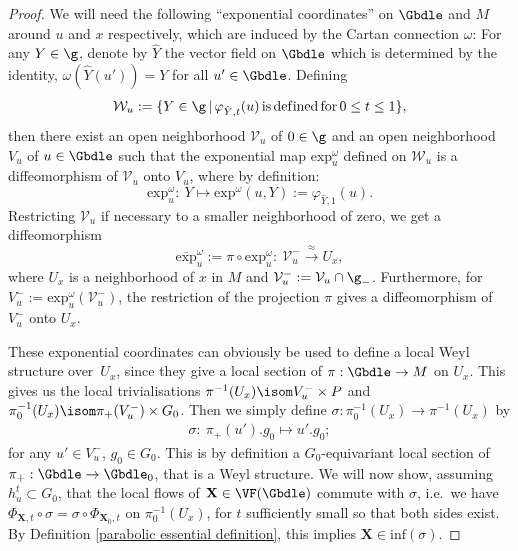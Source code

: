 \begin{proof} We will need the following ``exponential coordinates'' on $\Gbdle$ and $M$ around $u$ and $x$ respectively, which are induced by the Cartan connection $\omega$: For any $Y \in \g$, denote by $\hat{Y}$ the vector f\/ield on $\Gbdle$ which is determined by the identity, $\omega(\hat{Y}(u')) = Y$ for all $u' \in \Gbdle$. Def\/ining
\[
\mathcal{W}_u := \{ Y \in \g \, \vert \, \varphi_{\hat{Y},t}(u) \, \mathrm{is} \, \mathrm{def\/ined} \, \mathrm{for} \, 0 \leq t \leq 1 \},
\]
then there exist an open neighborhood $\mathcal{V}_u$ of $0 \in \g$ and an open neighborhood $V_u$ of $u \in \Gbdle$ such that the exponential map $\mathrm{exp}_u^{\omega}$ def\/ined on $\mathcal{W}_u$ is a dif\/feomorphism of $\mathcal{V}_u$ onto $V_u$, where by def\/inition:
\[
\mathrm{exp}_u^{\omega}: \  Y \mapsto \mathrm{exp}^{\omega}(u,Y) := \varphi_{\hat{Y},1}(u).
\]
Restricting $\mathcal{V}_u$ if necessary to a smaller neighborhood of zero, we get a dif\/feomorphism
\[
\overline{\mathrm{exp}}_u^{\omega} := \pi \circ \mathrm{exp}_u^{\omega}: \ \mathcal{V}_u^- \stackrel{\approx}{\rightarrow} U_x,
\]
where $U_x$ is a neighborhood of $x$ in $M$ and $\mathcal{V}_u^- := \mathcal{V}_u \cap \g_-$. Furthermore, for $V_u^- := \mathrm{exp}^{\omega}_u(\mathcal{V}_u^-)$, the restriction of the projection $\pi$ gives a dif\/feomorphism of $V_u^-$ onto $U_x$.

These exponential coordinates can obviously be used to def\/ine a local Weyl structure over~$U_x$, since they give a local section of $\pi: \Gbdle \rightarrow M$ on $U_x$. This gives us the local trivialisations $\pi^{-1}(U_x) \isom V_u^- \times P$ and $\pi_0^{-1}(U_x) \isom \pi_+(V_u^-) \times G_0$. Then we simply def\/ine $\sigma: \pi_0^{-1}(U_x) \rightarrow \pi^{-1}(U_x)$ by
\begin{gather}
\sigma: \ \pi_+(u').g_0 \mapsto u'.g_0; \label{exponential Weyl structure}
\end{gather}
for any $u' \in V_u^-$, $g_0 \in G_0$. This is by def\/inition a $G_0$-equivariant local section of $\pi_+: \Gbdle \rightarrow \Gbdle_0$, that is a Weyl structure. We will now show, assuming $h_u^t \subset G_0$, that the local f\/lows of $\mathbf{X} \in \VF(\Gbdle)$ commute with $\sigma$, i.e.\ we have $\Phi_{\mathbf{X},t} \circ \sigma = \sigma \circ \Phi_{\mathbf{X}_0,t}$ on $\pi_0^{-1}(U_x)$, for $t$ suf\/f\/iciently small so that both sides exist. By Def\/inition \ref{parabolic essential definition}, this implies $\mathbf{X} \in \mathrm{inf}(\sigma)$.


\end{proof}
